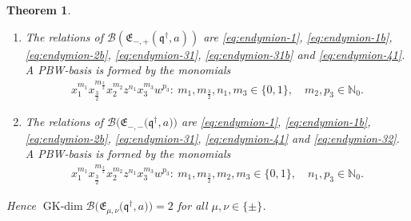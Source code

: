 \documentclass[pdftex]{sigma}
\numberwithin{equation}{section}
\newtheorem{Theorem}{Theorem}[section]
\newcommand{\GK}{\operatorname{GK-dim}}
\newcommand{\toba}{\mathscr B}
\newcommand{\N}{{\mathbb N}}
\newcommand{\eny}{\mathfrak{E}}
\newcommand{\bq}{\mathfrak{q}}
\newcommand{\bqs}{\bq^{\dagger}}
\newcommand{\tresdos}{\frac{3}{2}}
\begin{document}
\begin{Theorem}
\begin{enumerate}[label=$(\alph*)$]
\item The relations of $\toba(\eny_{-, +}(\bqs, a))$ are
\eqref{eq:endymion-1}, \eqref{eq:endymion-1b}, \eqref{eq:endymion-2b}, \eqref{eq:endymion-31}, \eqref{eq:endymion-31b} and \eqref{eq:endymion-41}.
A PBW-basis is formed by the monomials
\begin{align*}
x_1^{m_1} x_{\tresdos}^{m_{\tresdos}} x_2^{m_2}z^{n_{1}}x_{3}^{m_{3}}w^{p_{3}}\colon\
m_1, m_{\tresdos}, n_1, m_3\in \{0,1\}, \quad m_2, p_{3} \in\N_0.
\end{align*}

\item The relations of $\toba\big(\eny_{-, -}\big(\bqs, a\big)\big)$ are \eqref{eq:endymion-1}, \eqref{eq:endymion-1b}, \eqref{eq:endymion-2b}, \eqref{eq:endymion-31},
\eqref{eq:endymion-41} and \eqref{eq:endymion-32}. A PBW-basis is formed by the monomials
\begin{align*}
x_1^{m_1} x_{\tresdos}^{m_{\tresdos}} x_2^{m_2}z^{n_{1}}x_{3}^{m_{3}}w^{p_{3}}\colon\
m_1, m_{\tresdos}, m_2, m_3\in \{0,1\}, \quad n_1, p_{3} \in\N_0.
\end{align*}
\end{enumerate}

Hence
$\GK \toba\big(\eny_{\mu, \nu}\big(\bqs, a\big)\big) = 2$ for all $\mu, \nu \in \{\pm\}$.
\end{Theorem}
\end{document}
